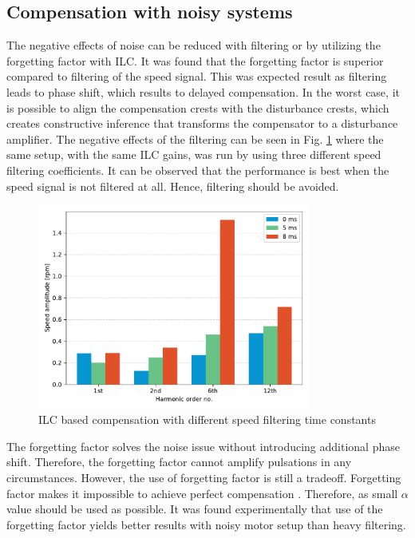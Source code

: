 \subsection{Compensation with noisy systems}
The negative effects of noise can be reduced with filtering or by utilizing the forgetting factor with ILC. It was found that the forgetting factor is superior compared to filtering of the speed signal. This was expected result as filtering leads to phase shift, which results to delayed compensation. In the worst case, it is possible to align the compensation crests with the disturbance crests, which creates constructive inference that transforms the compensator to a disturbance amplifier. The negative effects of the filtering can be seen in Fig. \ref{Fig:ILC-filtering} where the same setup, with the same ILC gains, was run by using three different speed filtering coefficients. It can be observed that the performance is best when the speed signal is not filtered at all. Hence, filtering should be avoided. 
\begin{figure}[htb] 
    \centering
    \includegraphics[width=0.8\textwidth]{images/ILC-speed-filters.pdf}
    \caption{ILC based compensation with different speed filtering time constants}
    \label{Fig:ILC-filtering} 
\end{figure}
The forgetting factor solves the noise issue without introducing additional phase shift. Therefore, the forgetting factor cannot amplify pulsations in any circumstances. However, the use of forgetting factor is still a tradeoff. Forgetting factor makes it impossible to achieve perfect compensation \cite{ILC:2004, ILC:2005}. Therefore, as small $\alpha$ value should be used as possible. It was found experimentally that use of the forgetting factor yields better results with noisy motor setup than heavy filtering.

